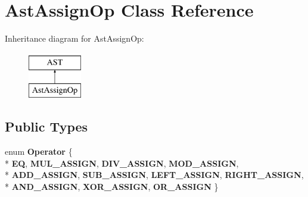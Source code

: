 \hypertarget{classAstAssignOp}{\section{Ast\-Assign\-Op Class Reference}
\label{classAstAssignOp}
}
Inheritance diagram for Ast\-Assign\-Op\-:\begin{figure}[H]
\begin{center}
\leavevmode
\includegraphics[height=2.000000cm]{classAstAssignOp}
\end{center}
\end{figure}
\subsection*{Public Types}
\begin{DoxyCompactItemize}
\item 
enum {\bfseries Operator} \{ \\*
{\bfseries E\-Q}, 
{\bfseries M\-U\-L\-\_\-\-A\-S\-S\-I\-G\-N}, 
{\bfseries D\-I\-V\-\_\-\-A\-S\-S\-I\-G\-N}, 
{\bfseries M\-O\-D\-\_\-\-A\-S\-S\-I\-G\-N}, 
\\*
{\bfseries A\-D\-D\-\_\-\-A\-S\-S\-I\-G\-N}, 
{\bfseries S\-U\-B\-\_\-\-A\-S\-S\-I\-G\-N}, 
{\bfseries L\-E\-F\-T\-\_\-\-A\-S\-S\-I\-G\-N}, 
{\bfseries R\-I\-G\-H\-T\-\_\-\-A\-S\-S\-I\-G\-N}, 
\\*
{\bfseries A\-N\-D\-\_\-\-A\-S\-S\-I\-G\-N}, 
{\bfseries X\-O\-R\-\_\-\-A\-S\-S\-I\-G\-N}, 
{\bfseries O\-R\-\_\-\-A\-S\-S\-I\-G\-N}
 \}
\end{DoxyCompactItemize}
